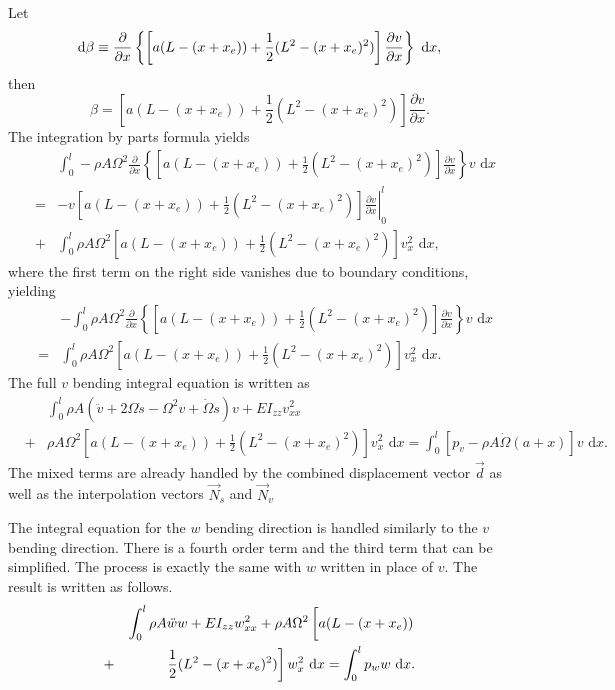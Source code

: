 Let
\begin{equation}
\text d\beta \equiv \frac{\partial}{\partial x}\left\lbrace \left[a(L-(x+x_e))+\frac{1}{2}(L^2-(x+x_e)^2)\right]\frac{\partial v}{\partial x}\right\rbrace\text{ d}x,
\end{equation}
then
\begin{equation}
\beta = \left[a(L-(x+x_e))+\frac{1}{2}(L^2-(x+x_e)^2)\right]\frac{\partial v}{\partial x}.
\end{equation}
The integration by parts formula yields
\begin{eqnarray}
\label{eq:v.disc.int.by.parts.2}
& &\int_0^l-\rho A\Omega^2\frac{\partial}{\partial x}\left\lbrace \left[a(L-(x+x_e))+\frac{1}{2}(L^2-(x+x_e)^2)\right]\frac{\partial v}{\partial x}\right\rbrace v\text{ d}x\nonumber\\
&=&-\left.v\left[a(L-(x+x_e))+\frac{1}{2}(L^2-(x+x_e)^2)\right]\frac{\partial v}{\partial x}\right|_0^l\\
&+&\int_0^l \rho A\Omega^2\left[a(L-(x+x_e))+\frac{1}{2}(L^2-(x+x_e)^2)\right]v_x^2\text{ d}x, \nonumber
\end{eqnarray}
where the first term on the right side vanishes due to boundary conditions, yielding
\begin{eqnarray}
& &-\int_0^l\rho A\Omega^2\frac{\partial}{\partial x}\left\lbrace \left[a(L-(x+x_e))+\frac{1}{2}(L^2-(x+x_e)^2)\right]\frac{\partial v}{\partial x}\right\rbrace v\text{ d}x\\
&=& \int_0^l \rho A\Omega^2\left[a(L-(x+x_e))+\frac{1}{2}(L^2-(x+x_e)^2)\right]v_x^2\text{ d}x. \nonumber
\end{eqnarray}
The full $v$ bending integral equation is written as
\begin{eqnarray}
\label{eq:v_bending_integral_eqn}
& &\int_0^l\rho A(\ddot v + 2\Omega\dot s-\Omega^2v+\dot\Omega s)v+EI_{zz}v_{xx}^2\\
&+&\rho A\Omega^2\left[a(L-(x+x_e))+\frac{1}{2}(L^2-(x+x_e)^2)\right]v_x^2\text{ d}x = \int_0^l[p_v - \rho A\dot\Omega(a+x)]v\text{ d}x. \nonumber
\end{eqnarray}
The mixed terms are already handled by the combined displacement vector $\vec d$ as well as the interpolation vectors $\vec N_s$ and $\vec N_v$

The integral equation for the $w$ bending direction is handled similarly to the $v$ bending direction. There is a fourth order term and the third term that can be simplified. The process is exactly the same with $w$ written in place of $v$. The result is written as follows.
\begin{eqnarray}
& &\int_0^l\rho A\ddot ww+EI_{zz}w_{xx}^2+\rho A\Omega^2\left[a(L-(x+x_e))\vphantom{\frac{0}{0}}\right. \label{eq:w.bending.integral.eqn}\\
&+& \left.\frac{1}{2}(L^2-(x+x_e)^2)\right]w_x^2\text{ d}x = \int_0^lp_ww\text{ d}x.\nonumber 
\end{eqnarray}

